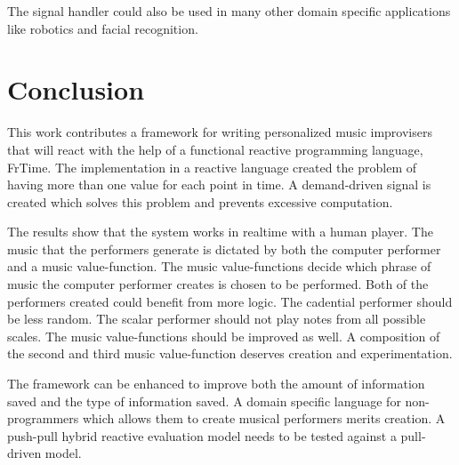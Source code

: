 \documentclass[12pt]{ucthesis}
\begin{document}
The signal handler could also be used in many other domain specific applications like robotics and facial recognition. 

\chapter{Conclusion}
\label{conclusion}

This work contributes a framework for writing personalized music improvisers that will react with the help of a functional reactive programming language, FrTime. The implementation in a reactive language created the problem of having more than one value for each point in time. A demand-driven signal is created which solves this problem and prevents excessive computation.

The results show that the system works in realtime with a human player. The music that the performers generate is dictated by both the computer performer and a music value-function. The music value-functions decide which phrase of music the computer performer creates is chosen to be performed. Both of the performers created could benefit from more logic. The cadential performer should be less random. The scalar performer should not play notes from all possible scales. The music value-functions should be improved as well. A composition of the second and third music value-function deserves creation and experimentation. 

The framework can be enhanced to improve both the amount of information saved and the type of information saved. A domain specific language for non-programmers which allows them to create musical performers merits creation. A push-pull hybrid reactive evaluation model needs to be tested against a pull-driven model. 



\clearpage


\end{document}
